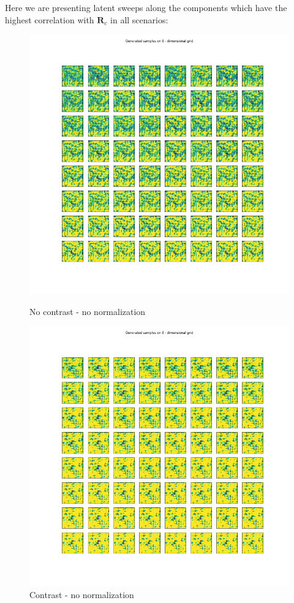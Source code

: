 \documentclass[12pt, english]{article}
\begin{document}
\vspace{4mm}

\par Here we are presenting latent sweeps along the components which have the highest correlation with $\bm{R}_c$ in all scenarios:

\vspace{4mm}

\begin{figure}[H] 
  \label{fig:contrast-correlation} 
  \begin{minipage}{0.5\linewidth}
    \centering
    \includegraphics[width=.62\linewidth]{lvae2/no_norm_no_contrast_sweep.png} 
    \caption{No contrast - no normalization} 
    \label{fig:no-contrast-no-norm-sweep}
  \end{minipage}%
  \begin{minipage}{0.5\linewidth}
    \centering
    \includegraphics[width=.62\linewidth]{lvae2/no_norm_contrast_sweep.png} 
    \caption{Contrast - no normalization} 
    \label{fig:contrast-no-norm-sweep}
  \end{minipage}
\end{figure}
\end{document}

